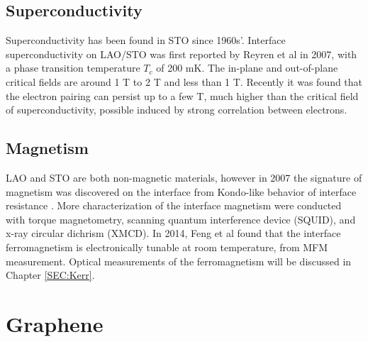 \documentclass[pdflatex, sectionletters, 12pt]{pittetd}    %
\begin{document}
\subsection{Superconductivity}

Superconductivity has been found in STO since 1960s'\cite{schooley1964superconductivity}. Interface superconductivity on LAO/STO was first reported by Reyren et al in 2007\cite{reyren2007superconducting}, with a phase transition temperature $T_c$ of 200 mK. The in-plane and out-of-plane critical fields are around 1 T to 2 T and less than 1 T. Recently it was found that the electron pairing can persist up to a few T, much higher than the critical field of superconductivity, possible induced by strong correlation between electrons\cite{cheng2015electron}.

\subsection{Magnetism}

LAO and STO are both non-magnetic materials, however in 2007 the signature of magnetism was discovered on the interface from Kondo-like behavior of interface resistance \cite{brinkman2007magnetic}. More characterization of the interface magnetism were conducted with torque magnetometry\cite{li2011coexistence}, scanning quantum interference device (SQUID)\cite{bert2011direct}, and x-ray circular dichrism (XMCD)\cite{lee2013titanium}. In 2014, Feng et al found that the interface ferromagnetism is electronically tunable at room temperature, from MFM measurement\cite{bi2014room}. Optical measurements of the ferromagnetism will be discussed in Chapter \ref{SEC:Kerr}.

\section{Graphene}
\end{document}
